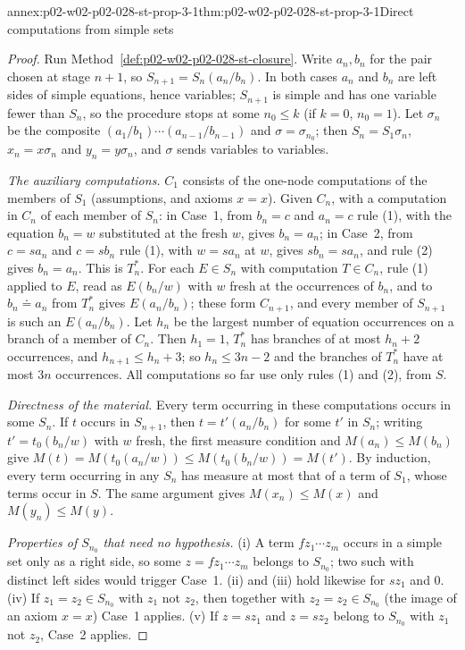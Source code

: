 \begin{annexitem}{annex:p02-w02-p02-028-st-prop-3-1}{thm:p02-w02-p02-028-st-prop-3-1}{Direct computations from simple sets}
\begin{proof}
Run Method~\ref{def:p02-w02-p02-028-st-closure}.  Write \(a_n,b_n\) for the
pair chosen at stage \(n+1\), so \(S_{n+1}=S_n(a_n/b_n)\).  In both cases
\(a_n\) and \(b_n\) are left sides of simple equations, hence variables;
\(S_{n+1}\) is simple and has one variable fewer than \(S_n\), so the
procedure stops at some \(n_0\leq k\) (if \(k=0\), \(n_0=1\)).  Let
\(\sigma_n\) be the composite \((a_1/b_1)\cdots(a_{n-1}/b_{n-1})\) and
\(\sigma=\sigma_{n_0}\); then \(S_n=S_1\sigma_n\), \(x_n=x\sigma_n\) and
\(y_n=y\sigma_n\), and \(\sigma\) sends variables to variables.

\emph{The auxiliary computations.}  \(C_1\) consists of the one-node
computations of the members of \(S_1\) (assumptions, and axioms \(x=x\)).
Given \(C_n\), with a computation in \(C_n\) of each member of \(S_n\):
in Case~1, from \(b_n=c\) and \(a_n=c\) rule (1), with the equation
\(b_n=w\) substituted at the fresh \(w\), gives \(b_n=a_n\); in Case~2, from
\(c=sa_n\) and \(c=sb_n\) rule (1), with \(w=sa_n\) at \(w\), gives
\(sb_n=sa_n\), and rule (2) gives \(b_n=a_n\).  This is \(T^*_n\).  For each
\(E\in S_n\) with computation \(T\in C_n\), rule (1) applied to \(E\), read as
\(E(b_n/w)\) with \(w\) fresh at the occurrences of \(b_n\), and to
\(b_n\doteq a_n\) from \(T^*_n\) gives \(E(a_n/b_n)\); these form \(C_{n+1}\),
and every member of \(S_{n+1}\) is such an \(E(a_n/b_n)\).  Let \(h_n\) be
the largest number of equation occurrences on a branch of a member of
\(C_n\).  Then \(h_1=1\), \(T^*_n\) has branches of at most \(h_n+2\)
occurrences, and \(h_{n+1}\leq h_n+3\); so \(h_n\leq3n-2\) and the branches
of \(T^*_n\) have at most \(3n\) occurrences.  All computations so far use
only rules (1) and (2), from \(S\).

\emph{Directness of the material.}  Every term occurring in these
computations occurs in some \(S_n\).  If \(t\) occurs in \(S_{n+1}\), then
\(t=t'(a_n/b_n)\) for some \(t'\) in \(S_n\); writing \(t'=t_0(b_n/w)\) with
\(w\) fresh, the first measure condition and \(M(a_n)\leq M(b_n)\) give
\(M(t)=M(t_0(a_n/w))\leq M(t_0(b_n/w))=M(t')\).  By induction, every term
occurring in any \(S_n\) has measure at most that of a term of \(S_1\), whose
terms occur in \(S\).  The same argument gives \(M(x_n)\leq M(x)\) and
\(M(y_n)\leq M(y)\).

\emph{Properties of \(S_{n_0}\) that need no hypothesis.}  (i) A term
\(fz_1\cdots z_m\) occurs in a simple set only as a right side, so some
\(z=fz_1\cdots z_m\) belongs to \(S_{n_0}\); two such with distinct left
sides would trigger Case~1.  (ii) and (iii) hold likewise for \(sz_1\) and
\(0\).  (iv) If \(z_1=z_2\in S_{n_0}\) with \(z_1\) not \(z_2\), then together
with \(z_2=z_2\in S_{n_0}\) (the image of an axiom \(x=x\)) Case~1 applies.
(v) If \(z=sz_1\) and \(z=sz_2\) belong to \(S_{n_0}\) with \(z_1\) not \(z_2\),
Case~2 applies.


\end{proof}
\end{annexitem}
